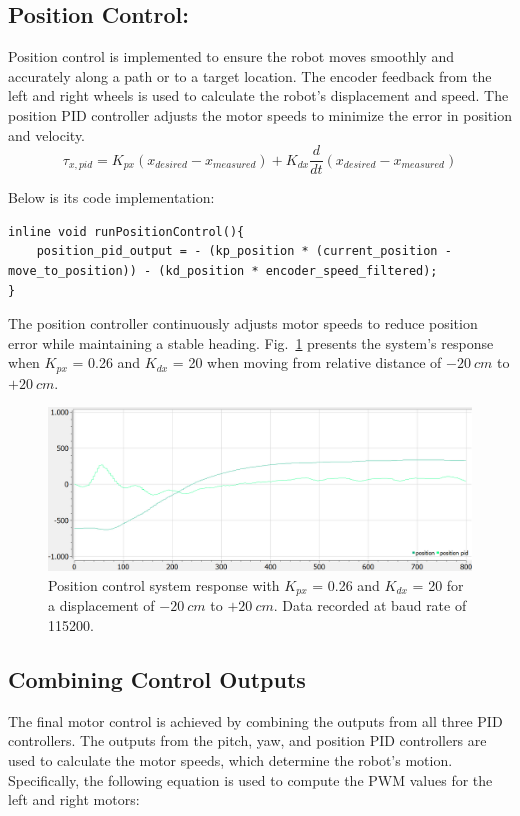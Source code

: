 \subsection{Position Control:}
Position control is implemented to ensure the robot moves smoothly and accurately along a path or to a target location. The encoder feedback from the left and right wheels is used to calculate the robot's displacement and speed. The position PID controller adjusts the motor speeds to minimize the error in position and velocity.
\begin{equation}
	\tau_{x,pid} = K_{px}(x_{desired} - x_{measured}) + K_{dx}\frac{d}{dt}(x_{desired} - x_{measured})
\end{equation}

Below is its code implementation:
\begin{lstlisting}[style=cppstyle2]
inline void runPositionControl(){
	position_pid_output = - (kp_position * (current_position - move_to_position)) - (kd_position * encoder_speed_filtered);
}
\end{lstlisting}

The position controller continuously adjusts motor speeds to reduce position error while maintaining a stable heading. Fig.~\ref{fig:pid_postition} presents the system's response when \(K_{px}\) = 0.26 and $K_{dx}$ = 20 when moving from relative distance of $-20 \ cm$ to $+20 \ cm$.
\begin{figure}[H]
	\centering
	\includegraphics[width=0.8\linewidth]{assets/pid_position_kp_0_26_kd_20.png}
	\caption{Position control system response with \(K_{px}\) = 0.26 and $K_{dx}$ = 20 for a displacement of $-20 \ cm$ to $+20 \ cm$. Data recorded at baud rate of 115200.}
	\label{fig:pid_postition}
\end{figure}


\subsection{Combining Control Outputs}
The final motor control is achieved by combining the outputs from all three PID controllers. The outputs from the pitch, yaw, and position PID controllers are used to calculate the motor speeds, which determine the robot's motion. Specifically, the following equation is used to compute the PWM values for the left and right motors:

